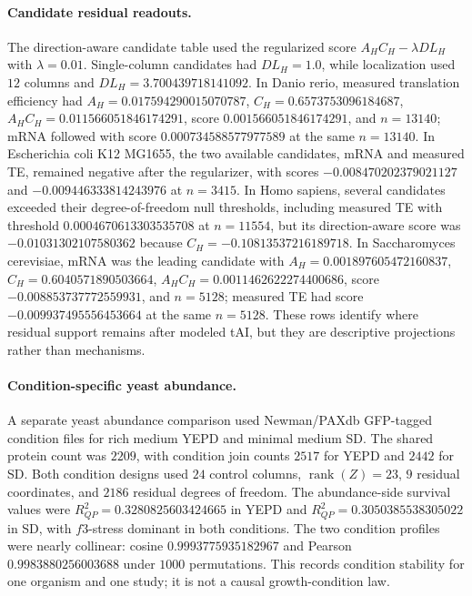 \paragraph{Candidate residual readouts.}
The direction-aware candidate table used the regularized score $A_H C_H-\lambda DL_H$ with $\lambda=0.01$.  Single-column candidates had $DL_H=1.0$, while localization used $12$ columns and $DL_H=3.700439718141092$.  In Danio rerio, measured translation efficiency had $A_H=0.017594290015070787$, $C_H=0.6573753096184687$, $A_HC_H=0.011566051846174291$, score $0.001566051846174291$, and $n=13140$; mRNA followed with score $0.000734588577977589$ at the same $n=13140$.  In Escherichia coli K12 MG1655, the two available candidates, mRNA and measured TE, remained negative after the regularizer, with scores $-0.008470202379021127$ and $-0.009446333814243976$ at $n=3415$.  In Homo sapiens, several candidates exceeded their degree-of-freedom null thresholds, including measured TE with threshold $0.0004670613303535708$ at $n=11554$, but its direction-aware score was $-0.01031302107580362$ because $C_H=-0.10813537216189718$.  In Saccharomyces cerevisiae, mRNA was the leading candidate with $A_H=0.001897605472160837$, $C_H=0.6040571890503664$, $A_HC_H=0.0011462622274400686$, score $-0.008853737772559931$, and $n=5128$; measured TE had score $-0.009937495556453664$ at the same $n=5128$.  These rows identify where residual support remains after modeled tAI, but they are descriptive projections rather than mechanisms.

\paragraph{Condition-specific yeast abundance.}
A separate yeast abundance comparison used Newman/PAXdb GFP-tagged condition files for rich medium YEPD and minimal medium SD.  The shared protein count was $2209$, with condition join counts $2517$ for YEPD and $2442$ for SD.  Both condition designs used $24$ control columns, $\operatorname{rank}(Z)=23$, $9$ residual coordinates, and $2186$ residual degrees of freedom.  The abundance-side survival values were $R^2_{QP}=0.3280825603424665$ in YEPD and $R^2_{QP}=0.3050385538305022$ in SD, with $f3$-stress dominant in both conditions.  The two condition profiles were nearly collinear: cosine $0.9993775935182967$ and Pearson $0.9983880256003688$ under $1000$ permutations.  This records condition stability for one organism and one study; it is not a causal growth-condition law.

